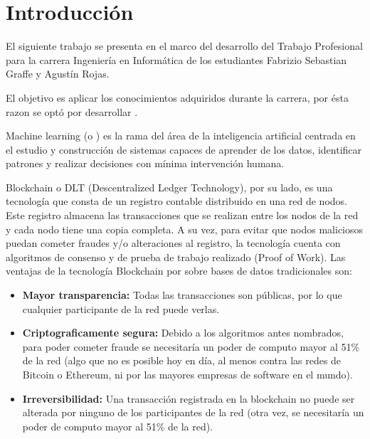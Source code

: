 \documentclass[
11pt, %
oneside, %
spanish, %
singlespacing, %
parskip, %
headsepline, %
chapterinoneline, %
]{MastersDoctoralThesis} %
\begin{document}

\tableofcontents %


\mainmatter %

\pagestyle{thesis} %


\chapter{Introducci\'on}
\justify
El siguiente trabajo se presenta en el marco del desarrollo del Trabajo Profesional para la carrera Ingeniería en Informática de los estudiantes Fabrizio Sebastian Graffe y Agustín Rojas. 

El objetivo es aplicar los conocimientos adquiridos durante la carrera, por ésta razon se optó por desarrollar \textbf{ }.

Machine learning (o ) es la rama del área de la inteligencia artificial centrada en el estudio y construcción de sistemas capaces de aprender de los datos, identificar patrones y realizar decisiones con mínima intervención humana.

Blockchain \cite{bc} o DLT (Descentralized Ledger Technology), por su lado, es una tecnología que consta de un registro contable distribuido en una red de nodos. Este registro almacena las transacciones que se realizan entre los nodos de la red y cada nodo tiene una copia completa. A su vez, para evitar que nodos maliciosos puedan cometer fraudes y/o alteraciones al registro, la tecnología cuenta con algoritmos de consenso y de prueba de trabajo realizado (Proof of Work).
Las ventajas de la tecnología Blockchain por sobre bases de datos tradicionales son:

\begin{itemize}
\item \textbf{Mayor transparencia:} Todas las transacciones son públicas, por lo que cualquier participante de la red puede verlas.
\item \textbf{Criptograficamente segura:} Debido a los algoritmos antes nombrados, para poder cometer fraude se necesitaría un poder de computo mayor al 51\% de la red (algo que no es posible hoy en día, al menos contra las redes de Bitcoin o Ethereum, ni por las mayores empresas de software en el mundo).
\item \textbf{Irreversibilidad:} Una transacción registrada en la blockchain no puede ser alterada por ninguno de los participantes de la red (otra vez, se necesitaría un poder de computo mayor al 51\% de la red).
\end{itemize}
\end{document}
